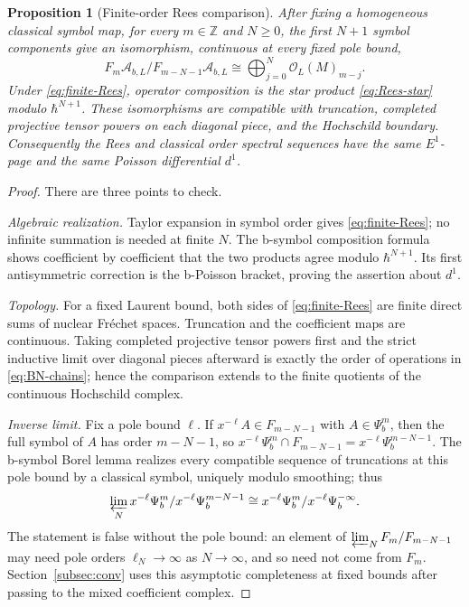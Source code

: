 \documentclass[11pt,oneside,reqno]{article}
\newcommand{\cA}{\mathcal A}
\theoremstyle{plain}
\newtheorem{proposition}[theorem]{Proposition}
\theoremstyle{definition}
\theoremstyle{remark}
\begin{document}
\begin{proposition}[Finite-order Rees comparison]
\label{prop:Borel-formality}
After fixing a homogeneous classical symbol map, for every
\(m\in\mathbb Z\) and \(N\geq0\), the first \(N+1\) symbol components give an
isomorphism, continuous at every fixed pole bound,
\begin{equation}\label{eq:finite-Rees}
 F_m\cA_{b,L}/F_{m-N-1}\cA_{b,L}
 \cong
 \bigoplus_{j=0}^{N}\mathcal O_L(M)_{m-j}.
\end{equation}
Under \eqref{eq:finite-Rees}, operator composition is the star product
\eqref{eq:Rees-star} modulo \(\hbar^{N+1}\).  These isomorphisms are
compatible with truncation, completed projective tensor powers on each
diagonal piece, and the Hochschild boundary.  Consequently the Rees and
classical order spectral sequences have the same \(E^1\)-page and the same
Poisson differential \(d^1\).
\end{proposition}

\begin{proof}
There are three points to check.

\emph{Algebraic realization.}
Taylor expansion in symbol order gives \eqref{eq:finite-Rees}; no infinite
summation is needed at finite \(N\).  The b-symbol composition formula shows
coefficient by coefficient that the two products agree modulo
\(\hbar^{N+1}\).  Its first antisymmetric correction is the b-Poisson
bracket, proving the assertion about \(d^1\).

\emph{Topology.}
For a fixed Laurent bound, both sides of \eqref{eq:finite-Rees} are finite
direct sums of nuclear Fr\'echet spaces.  Truncation and the coefficient maps
are continuous.  Taking completed projective tensor powers first and the
strict inductive limit over diagonal pieces afterward is exactly the order
of operations in \eqref{eq:BN-chains}; hence the comparison extends to the
finite quotients of the continuous Hochschild complex.

\emph{Inverse limit.}
Fix a pole bound \(\ell\). If \(x^{-\ell}A\in F_{m-N-1}\) with
\(A\in\Psi_b^m\), then the full symbol of \(A\) has order \(m-N-1\), so
\(x^{-\ell}\Psi_b^m\cap F_{m-N-1}=x^{-\ell}\Psi_b^{m-N-1}\). The b-symbol
Borel lemma realizes every compatible sequence of truncations at this pole
bound by a classical symbol, uniquely modulo smoothing; thus
\[
 \varprojlim_N x^{-\ell}\Psi_b^m/x^{-\ell}\Psi_b^{m-N-1}
 \cong x^{-\ell}\Psi_b^m/x^{-\ell}\Psi_b^{-\infty}.
\]
The statement is false without the pole bound: an element of
\(\varprojlim_NF_m/F_{m-N-1}\) may need pole orders \(\ell_N\to\infty\) as
\(N\to\infty\), and so need not come from \(F_m\). Section~\ref{subsec:conv} uses this asymptotic completeness at fixed
bounds after passing to the mixed coefficient complex.
\end{proof}
\end{document}
